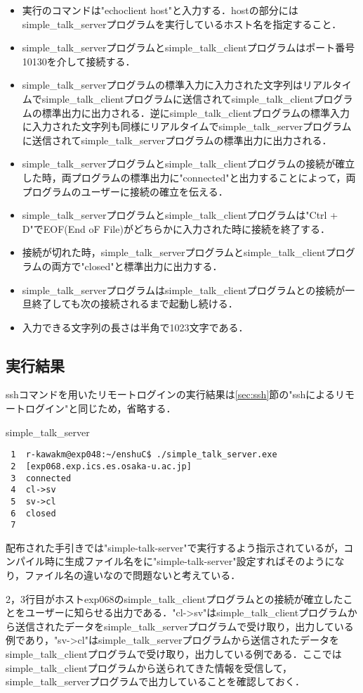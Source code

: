 \documentclass[a4j]{jarticle}
\newenvironment{ite}{\begin{itemize}}{\end{itemize}} %
\newenvironment{bit}{\begin{breakitembox}}{\end{breakitembox}} %
\newcommand{\sts}{simple\_talk\_serverプログラム}
\newcommand{\stc}{simple\_talk\_clientプログラム}
\begin{document}
\begin{ite}
\item 実行のコマンドは"echoclient host"と入力する．hostの部分には\sts を実行しているホスト名を指定すること．
\item \sts と\stc はポート番号10130を介して接続する．
\item \sts の標準入力に入力された文字列はリアルタイムで\stc に送信されて\stc の標準出力に出力される．逆に\stc の標準入力に入力された文字列も同様にリアルタイムで\sts に送信されて\sts の標準出力に出力される．
\item \sts と\stc の接続が確立した時，両プログラムの標準出力に"connected"と出力することによって，両プログラムのユーザーに接続の確立を伝える．
\item \sts と\stc は"Ctrl + D"でEOF(End oF File)がどちらかに入力された時に接続を終了する．
\item 接続が切れた時，\sts と\stc の両方で"closed"と標準出力に出力する．
\item \sts は\stc との接続が一旦終了しても次の接続されるまで起動し続ける．
\item 入力できる文字列の長さは半角で1023文字である．
\end{ite}

\subsection{実行結果}
\label{sec:talk_result}

sshコマンドを用いたリモートログインの実行結果は\ref{sec:ssh}節の"sshによるリモートログイン"と同じため，省略する．

\begin{bit}[l]{simple\_talk\_server}
\begin{verbatim}
 1	r-kawakm@exp048:~/enshuC$ ./simple_talk_server.exe
 2	[exp068.exp.ics.es.osaka-u.ac.jp]
 3	connected
 4	cl->sv
 5	sv->cl
 6	closed
 7
\end{verbatim}
\end{bit}

配布された手引きでは"simple-talk-server"で実行するよう指示されているが，コンパイル時に生成ファイル名をに"simple-talk-server"設定すればそのようになり，ファイル名の違いなので問題ないと考えている．

2，3行目がホストexp068の\stc との接続が確立したことをユーザーに知らせる出力である．"cl->sv"は\stc から送信されたデータを\sts で受け取り，出力している例であり，"sv->cl"は\sts から送信されたデータを\stc で受け取り，出力している例である．ここでは\stc から送られてきた情報を受信して，\sts で出力していることを確認しておく．
\end{document}
